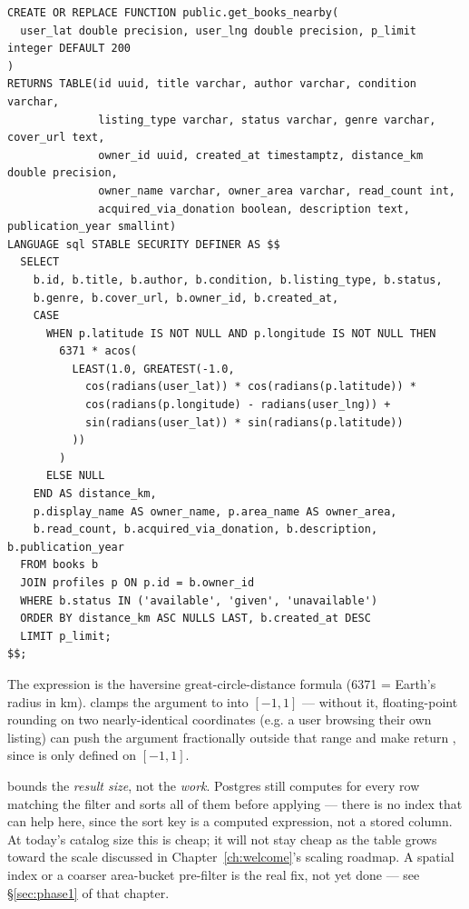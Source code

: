 \begin{lstlisting}[style=olkcodesql, caption={get\_books\_nearby — haversine distance, nulls last, bounded}]
CREATE OR REPLACE FUNCTION public.get_books_nearby(
  user_lat double precision, user_lng double precision, p_limit integer DEFAULT 200
)
RETURNS TABLE(id uuid, title varchar, author varchar, condition varchar,
              listing_type varchar, status varchar, genre varchar, cover_url text,
              owner_id uuid, created_at timestamptz, distance_km double precision,
              owner_name varchar, owner_area varchar, read_count int,
              acquired_via_donation boolean, description text, publication_year smallint)
LANGUAGE sql STABLE SECURITY DEFINER AS $$
  SELECT
    b.id, b.title, b.author, b.condition, b.listing_type, b.status,
    b.genre, b.cover_url, b.owner_id, b.created_at,
    CASE
      WHEN p.latitude IS NOT NULL AND p.longitude IS NOT NULL THEN
        6371 * acos(
          LEAST(1.0, GREATEST(-1.0,
            cos(radians(user_lat)) * cos(radians(p.latitude)) *
            cos(radians(p.longitude) - radians(user_lng)) +
            sin(radians(user_lat)) * sin(radians(p.latitude))
          ))
        )
      ELSE NULL
    END AS distance_km,
    p.display_name AS owner_name, p.area_name AS owner_area,
    b.read_count, b.acquired_via_donation, b.description, b.publication_year
  FROM books b
  JOIN profiles p ON p.id = b.owner_id
  WHERE b.status IN ('available', 'given', 'unavailable')
  ORDER BY distance_km ASC NULLS LAST, b.created_at DESC
  LIMIT p_limit;
$$;
\end{lstlisting}

\begin{olknote}
The  expression is the haversine great-circle-distance formula (6371 = Earth's radius in km).  clamps the argument to  into $[-1, 1]$ — without it, floating-point rounding on two nearly-identical coordinates (e.g. a user browsing their own listing) can push the argument fractionally outside that range and make  return , since  is only defined on $[-1,1]$.
\end{olknote}

\begin{olkwarn}
 bounds the \emph{result size}, not the \emph{work}. Postgres still computes  for every row matching the  filter and sorts all of them before applying  — there is no index that can help here, since the sort key is a computed expression, not a stored column. At today's catalog size this is cheap; it will not stay cheap as the  table grows toward the scale discussed in Chapter~\ref{ch:welcome}'s scaling roadmap. A spatial index or a coarser area-bucket pre-filter is the real fix, not yet done — see \S\ref{sec:phase1} of that chapter.
\end{olkwarn}

